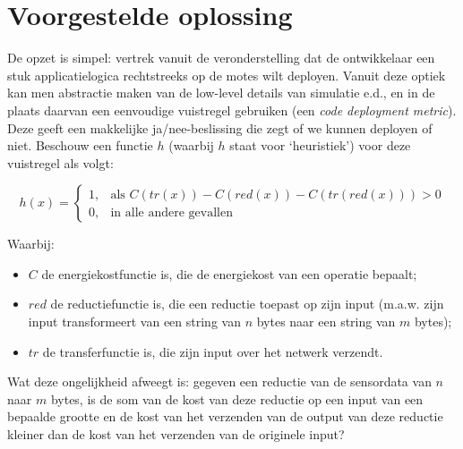 \documentclass[11pt]{article}
\begin{document}
\section{Voorgestelde oplossing}
De opzet is simpel: vertrek vanuit de veronderstelling dat de ontwikkelaar een
stuk applicatielogica rechtstreeks op de motes wilt deployen. Vanuit deze optiek
kan men abstractie maken van de low-level details van simulatie e.d., en in de plaats daarvan een eenvoudige vuistregel gebruiken (een \textit{code
deployment metric}). Deze geeft een makkelijke ja/nee-beslissing die zegt of we
kunnen deployen of niet. Beschouw een functie $h$ (waarbij $h$ staat voor
`heuristiek') voor deze vuistregel als volgt:


\[
h(x)= 
\begin{cases}
  1, & \text{als } C(tr(x)) - C(red(x)) - C(tr(red(x))) > 0  \\
  0, & \text{in alle andere gevallen}
\end{cases}
\]

Waarbij:

\begin{itemize}
\item $C$ de energiekostfunctie is, die de energiekost van een operatie bepaalt;
\item $red$ de reductiefunctie is, die een reductie toepast op zijn input
(m.a.w. zijn input transformeert van een string van $n$ bytes naar een string
van $m$ bytes);
\item $tr$ de transferfunctie is, die zijn input over het netwerk verzendt.
\end{itemize}

Wat deze ongelijkheid afweegt is: gegeven een reductie van de sensordata van $n$ naar
$m$ bytes, is de som van de kost van deze reductie op een input van een bepaalde
grootte en de kost van het verzenden van de output van deze reductie kleiner dan
de kost van het verzenden van de originele input?
\end{document}
